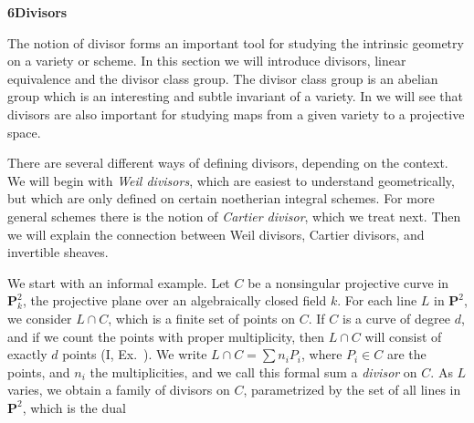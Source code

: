 {\medskip
\noindent\hypertarget{sec-II-6}{}{\large\bfseries 6\quad Divisors}\par
\smallskip
The notion of divisor forms an important tool for studying the intrinsic geometry on a variety or scheme. In this section we will introduce divisors, linear equivalence and the divisor class group. The divisor class group is an abelian group which is an interesting and subtle invariant of a variety. In  we will see that divisors are also important for studying maps from a given variety to a projective space.

There are several different ways of defining divisors, depending on the context. We will begin with \emph{Weil divisors}, which are easiest to understand geometrically, but which are only defined on certain noetherian integral schemes. For more general schemes there is the notion of \emph{Cartier divisor}, which we treat next. Then we will explain the connection between Weil divisors, Cartier divisors, and invertible sheaves.

\smallskip
We start with an informal example. Let $C$ be a nonsingular projective curve \EditionText{}in $\mathbf P_k^2$, the projective plane over an algebraically closed field $k$. For each line $L$ in $\mathbf P^2$, we consider $L\cap C$, which is a finite set of points on $C$. If $C$ is a curve of degree $d$, and if we count the points with proper multiplicity, then $L\cap C$ will consist of exactly $d$ points (I, Ex.~). We write $L\cap C=\sum n_iP_i$, where $P_i\in C$ are the points, and $n_i$ the multiplicities, and we call this formal sum a \emph{divisor} on $C$. As $L$ varies, we obtain a family of divisors on $C$, parametrized by the set of all lines in $\mathbf P^2$, which is the dual}
